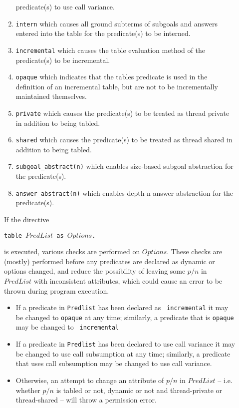 \begin{description}
\begin{enumerate}
  predicate(s) to use call variance.
%
\item {\tt intern} which causes all ground subterms of subgoals and 
answers entered into the table for the predicate(s) to be interned.
%
\item {\tt incremental} which causes the table evaluation method of
  the predicate(s) to be incremental.
%
\item {\tt opaque} which indicates that the tables predicate is used
  in the definition of an incremental table, but are not to be
  incrementally maintained themselves.  
%
\item {\tt private} which causes the predicate(s) to be treated as
  thread private in addition to being tabled.
%
\item {\tt shared} which causes the predicate(s) to be treated as
  thread shared in addition to being tabled.
%
\item {\tt subgoal\_abstract(n)}  which enables size-based subgoal abstraction for the predicate(s).
%
\item {\tt answer\_abstract(n)} which enables depth-n answer
  abstraction for the predicate(s).
%
\ei
\ei
\end{enumerate}

If the directive 

{\tt  table $PredList$ as $Options$.}

is executed, various checks are performed on $Options$.  These checks
are (mostly) performed before any predicates are declared as dynamic
or options changed, and reduce the possibility of leaving some $p/n$
in $PredList$ with inconsistent attributes, which could cause an error
to be thrown during program execution.
%
\begin{itemize}
\item If a predicate in {\tt Predlist} has been declared as {\tt
  incremental} it may be changed to {\tt opaque} at any time;
  similarly, a predicate that is {\tt opaque} may be changed to {\tt
    incremental}
%
\item If a predicate in {\tt Predlist} has been declared to use call
  variance it may be changed to use call subsumption at any time;
  similarly, a predicate that uses call subsumption may be changed to
  use call variance.
%
\item Otherwise, an attempt to change an attribute of $p/n$ in
  $PredList$ -- i.e. whether $p/n$ is tabled or not, dynamic or not
  and thread-private or thread-shared -- will throw a permission
  error.  
\end{itemize}


\end{description}
